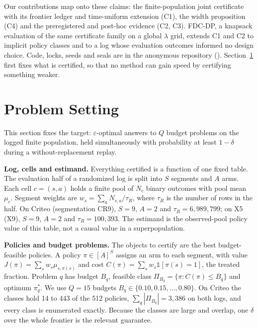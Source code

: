 \documentclass[sigconf,anonymous,review]{acmart}
\newcommand{\eps}{\varepsilon}
\begin{document}
\noindent Our contributions map onto these claims: the finite-population joint certificate with its frontier ledger and time-uniform extension (C1), the width proposition (C4) and the preregistered and post-hoc evidence (C2, C3). FDC-DP, a knapsack evaluation of the same certificate family on a global $\lambda$ grid, extends C1 and C2 to implicit policy classes and to a log whose evaluation outcomes informed no design choice. Code, locks, seeds and seals are in the anonymous repository (\anonrepo). Section~\ref{sec:setting} first fixes what is certified, so that no method can gain speed by certifying something weaker.

\section{Problem Setting}\label{sec:setting}

This section fixes the target: $\eps$-optimal answers to $Q$ budget problems on the logged finite population, held simultaneously with probability at least $1-\delta$ during a without-replacement replay.

\textbf{Log, cells and estimand.} Everything certified is a function of one fixed table. The evaluation half of a randomized log is split into $S$ segments and $A$ arms. Each cell $c = (s,a)$ holds a finite pool of $N_c$ binary outcomes with pool mean $\mu_c$. Segment weights are $w_s = \sum_a N_{s,a}/\tau_R$, where $\tau_R$ is the number of rows in the half. On Criteo (segmentation CR9), $S = 9$, $A = 2$ and $\tau_R = 6{,}989{,}799$; on X5 (X9), $S = 9$, $A = 2$ and $\tau_R = 100{,}393$. The estimand is the observed-pool policy value of this table, not a causal value in a superpopulation.

\textbf{Policies and budget problems.} The objects to certify are the best budget-feasible policies. A policy $\pi \in [A]^S$ assigns an arm to each segment, with value $J(\pi) = \sum_s w_s \mu_{s,\pi(s)}$ and cost $C(\pi) = \sum_s w_s \mathbb{1}[\pi(s) = 1]$, the treated fraction. Problem $q$ has budget $B_q$, feasible class $\Pi_{B_q} = \{\pi : C(\pi) \le B_q\}$ and optimum $\pi^*_q$. We use $Q = 15$ budgets $B_q \in \{0.10, 0.15, \dots, 0.80\}$. On Criteo the classes hold 14 to 443 of the 512 policies, $\sum_q |\Pi_{B_q}| = 3{,}386$ on both logs, and every class is enumerated exactly. Because the classes are large and overlap, one $\delta$ over the whole frontier is the relevant guarantee.
\end{document}
